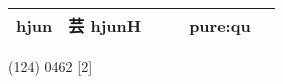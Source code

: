 \documentclass[14pt,a4paper]{scrartcl}
\begin{document}
\begin{longtable}[c]{@{}llllll@{}}
\begin{minipage}[t]{0.14\columnwidth}
hjun
\strut\end{minipage} &
\begin{minipage}[t]{0.14\columnwidth}\raggedright\strut
芸 hjunH
\strut\end{minipage} &
\begin{minipage}[t]{0.14\columnwidth}\raggedright\strut
\strut\end{minipage} &
\begin{minipage}[t]{0.14\columnwidth}\raggedright\strut
\strut\end{minipage} &
\begin{minipage}[t]{0.14\columnwidth}\raggedright\strut
pure:qu
\strut\end{minipage}\tabularnewline
\bottomrule
\end{longtable}

(124) 0462 {[}2{]}
\end{document}
